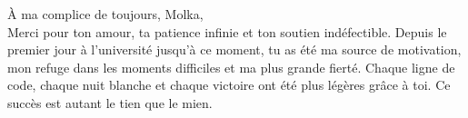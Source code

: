 \begin{titlepage}
\begin{center}
\begin{itshape}
À ma complice de toujours, Molka,\\
Merci pour ton amour, ta patience infinie et ton soutien indéfectible. Depuis le premier jour à l'université jusqu'à ce moment, tu as été ma source de motivation, mon refuge dans les moments difficiles et ma plus grande fierté. Chaque ligne de code, chaque nuit blanche et chaque victoire ont été plus légères grâce à toi. Ce succès est autant le tien que le mien.\\[0.5cm]

\end{itshape}

\vspace*{2cm} %

\end{center}
\end{titlepage}